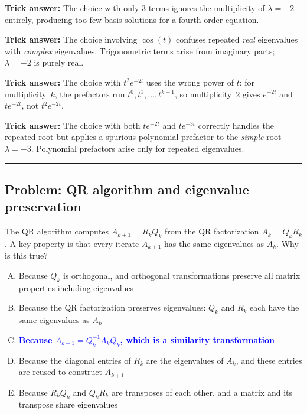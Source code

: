 \documentclass[12pt]{amsart}
\newcommand{\divider}{
  \vspace{-1em}
  \noindent
  \raisebox{-0.15ex}{\textbullet}%
  \hspace{0.5em}%
  \rule[0.5ex]{0.95\textwidth}{1.0pt}%
  \hspace{0.5em}%
  \raisebox{-0.15ex}{\textbullet}%
  \vspace{0em}
}
\begin{document}
\textbf{Trick answer:}
The choice with only $3$ terms ignores the multiplicity of $\lambda = -2$
entirely, producing too few basis solutions for a fourth-order equation.

\textbf{Trick answer:}
The choice involving $\cos(t)$ confuses repeated \emph{real} eigenvalues
with \emph{complex} eigenvalues. Trigonometric terms arise from imaginary
parts; $\lambda = -2$ is purely real.

\textbf{Trick answer:}
The choice with $t^2 e^{-2t}$ uses the wrong power of $t$: for
multiplicity~$k$, the prefactors run $t^0, t^1, \ldots, t^{k-1}$, so
multiplicity~$2$ gives $e^{-2t}$ and $te^{-2t}$, not $t^2 e^{-2t}$.

\textbf{Trick answer:}
The choice with both $te^{-2t}$ and $te^{-3t}$ correctly handles the
repeated root but applies a spurious polynomial prefactor to the
\emph{simple} root $\lambda = -3$. Polynomial prefactors arise only for
repeated eigenvalues.

\divider

\subsection*{Problem: QR algorithm and eigenvalue preservation}

The QR algorithm computes $A_{k+1} = R_k Q_k$ from the QR factorization
$A_k = Q_k R_k$.
A key property is that every iterate $A_{k+1}$ has the same eigenvalues
as $A_k$. Why is this true?

\begin{enumerate}[(A)]
\item Because $Q_k$ is orthogonal, and orthogonal transformations
      preserve all matrix properties including eigenvalues
\item Because the QR factorization preserves eigenvalues:
      $Q_k$ and $R_k$ each have the same eigenvalues as $A_k$
\item \textcolor{blue}{\textbf{Because $A_{k+1} = Q_k^{-1} A_k Q_k$,
      which is a similarity transformation}}
\item Because the diagonal entries of $R_k$ are the eigenvalues of
      $A_k$, and these entries are reused to construct $A_{k+1}$
\item Because $R_k Q_k$ and $Q_k R_k$ are transposes of each other,
      and a matrix and its transpose share eigenvalues
\end{enumerate}
\end{document}
